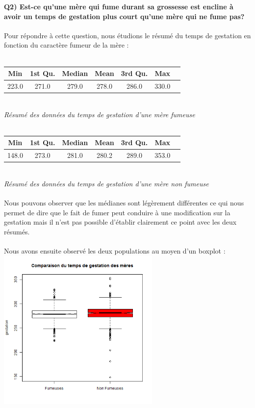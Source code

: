 \documentclass[a4paper, 8pt]{article}
\begin{document}
\newpage
\textbf{Q2) Est-ce qu’une mère qui fume durant sa grossesse est encline à avoir un temps de gestation plus
court qu’une mère qui ne fume pas?}\\ \\
Pour répondre à cette question, nous étudions le résumé du temps de gestation en fonction du caractère fumeur de la mère :\\ \\
\begin{tabular}{|c|c|c|c|c|c|c|}
\hline
Min & 1st Qu. & Median & Mean & 3rd Qu. & Max\\
\hline
223.0 & 271.0 & 279.0 & 278.0 & 286.0 & 330.0\\
\hline
\end{tabular}\\
\textit{R\'esum\'e des données du temps de gestation d'une m\`ere fumeuse}\\ \\
\begin{tabular}{|c|c|c|c|c|c|c|}
\hline
Min & 1st Qu. & Median & Mean & 3rd Qu. & Max\\
\hline
148.0 & 273.0 & 281.0 & 280.2 & 289.0 & 353.0\\
\hline
\end{tabular}\\
\textit{R\'esum\'e des données du temps de gestation d'une m\`ere non fumeuse}\\ \\
Nous pouvons observer que les m\'edianes sont l\'eg\`erement diff\'erentes ce qui nous permet de dire que le fait de fumer peut conduire \`a
une modification sur la gestation mais il n'est pas possible d'établir clairement ce point avec les deux r\'esum\'es.\\ \\
Nous avons ensuite observ\'e les deux populations au moyen d'un boxplot :\\
\includegraphics[height = 8cm, width = 8cm]{plots/boxplot_gestation_smoke.png}\\
\end{document}
